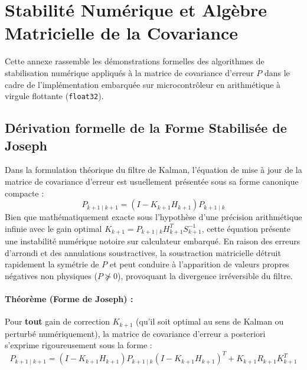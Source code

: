 \documentclass[../Formulations_Kalman.tex]{subfiles}
\begin{document}
\appendix

\section{Stabilité Numérique et Algèbre Matricielle de la Covariance}
\label{annexe:stabilite_numerique}

Cette annexe rassemble les démonstrations formelles des algorithmes de stabilisation numérique appliqués à la matrice de covariance d'erreur $P$ dans le cadre de l'implémentation embarquée sur microcontrôleur en arithmétique à virgule flottante (\texttt{float32}).

\subsection{Dérivation formelle de la Forme Stabilisée de Joseph}
\label{annexe:joseph}

Dans la formulation théorique du filtre de Kalman, l'équation de mise à jour de la matrice de covariance d'erreur est usuellement présentée sous sa forme canonique compacte :
\begin{equation}
P_{k+1\mid k+1} = (I - K_{k+1} H_{k+1}) P_{k+1\mid k}
\label{eq:cov_canonique}
\end{equation}
Bien que mathématiquement exacte sous l'hypothèse d'une précision arithmétique infinie avec le gain optimal $K_{k+1} = P_{k+1\mid k} H_{k+1}^T S_{k+1}^{-1}$, cette équation présente une instabilité numérique notoire sur calculateur embarqué. En raison des erreurs d'arrondi et des annulations soustractives, la soustraction matricielle détruit rapidement la symétrie de $P$ et peut conduire à l'apparition de valeurs propres négatives non physiques ($P \not\succeq 0$), provoquant la divergence irréversible du filtre.

\paragraph{Théorème (Forme de Joseph) :}
Pour \textbf{tout} gain de correction $K_{k+1}$ (qu'il soit optimal au sens de Kalman ou perturbé numériquement), la matrice de covariance d'erreur a posteriori s'exprime rigoureusement sous la forme :
\begin{equation}
\boxed{P_{k+1\mid k+1} = (I - K_{k+1} H_{k+1}) P_{k+1\mid k} (I - K_{k+1} H_{k+1})^T + K_{k+1} R_{k+1} K_{k+1}^T}
\label{eq:joseph_form}
\end{equation}
\end{document}
